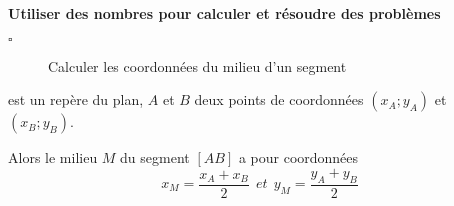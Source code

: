 \begin{titre}

\end{titre}


\begin{CpsCol}
\textbf{Utiliser des nombres pour calculer et résoudre des problèmes}
\begin{description}
\item[$\square$] Calculer les coordonnées du milieu d'un segment
\end{description}
\end{CpsCol}





\begin{Th} 
\Oij est un repère du plan, $A$ et $B$ deux points de coordonnées $(x_A;y_A)$ et  $(x_B;y_B)$. 

Alors le milieu $M$ du segment $[AB]$ a pour coordonnées $$x_M=\frac{x_A+x_B}{2} ~~ et ~~ y_M=\frac{y_A+y_B}{2}$$

\end{Th}

